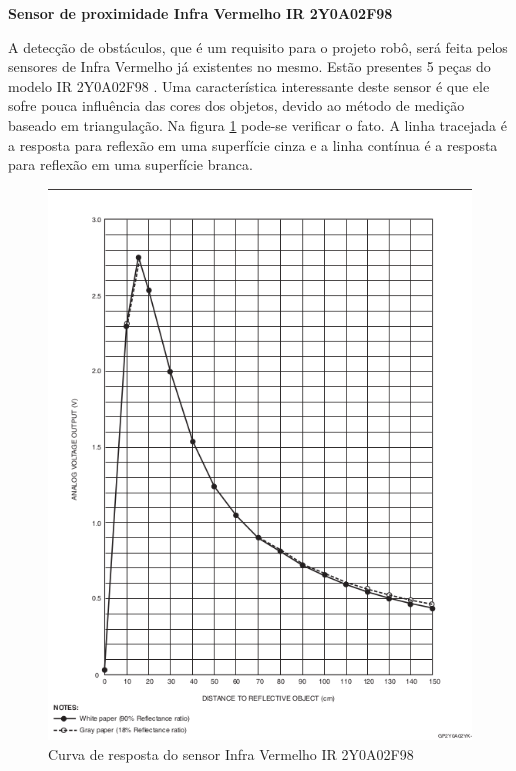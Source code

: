 \textbf{Sensor de proximidade Infra Vermelho IR 2Y0A02F98}

A detecção de obstáculos, que é um requisito para o projeto robô, será feita pelos sensores de Infra Vermelho já existentes no mesmo. Estão presentes 5 peças do modelo IR 2Y0A02F98 \cite{ir_sensor}. Uma característica interessante deste sensor é que ele sofre pouca influência das cores dos objetos, devido ao método de medição baseado em triangulação. Na figura \ref{fig:ir_sensor_response} pode-se verificar o fato. A linha tracejada é a resposta para reflexão em uma superfície cinza e a linha contínua é a resposta para reflexão em uma superfície branca.

\begin{figure}[H]
\centering
\includegraphics[width=1\textwidth]{./figuras/ir-sensor-response.png}
\caption{Curva de resposta do sensor Infra Vermelho IR 2Y0A02F98}
\label{fig:ir_sensor_response}
\end{figure}

